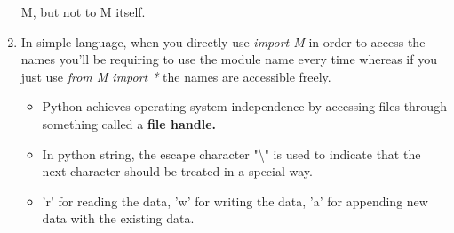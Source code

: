 \documentclass[11pt]{article}
\begin{document}
\begin{enumerate}
        M, but not to M itself. 
        \item In simple language, when you directly use \textit{import M} in order to access the names you'll be requiring to use the module name every time whereas if you just use \textit{from M import *} the names are accessible freely.
        \begin{itemize}
            \item Python achieves operating system independence by accessing files through something called a \textbf{file handle.}
            \item In python string, the escape character "\textbackslash" is used to indicate that the next character should be treated in a special way.
            \item 'r' for reading the data, 'w' for writing the data, 'a' for appending new data with the existing data.
        \end{itemize}
        
    \end{enumerate}
\end{document}
